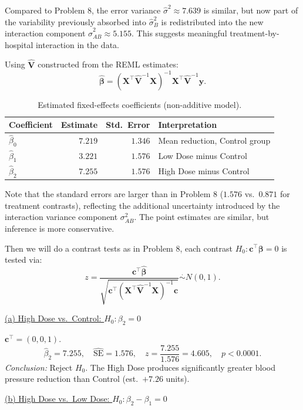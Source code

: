 \documentclass[letterpaper]{article}
\begin{document}
	Compared to Problem 8, the error variance $\hat{\sigma}^2 \approx 7.639$
	is similar, but now part of the variability previously absorbed into
	$\hat{\sigma}^2_B$ is redistributed into the new interaction component
	$\hat{\sigma}^2_{AB} \approx 5.155$. This suggests meaningful
	treatment-by-hospital interaction in the data.
	

	
	Using $\hat{\mathbf{V}}$ constructed from the REML estimates:
	\[
	\hat{\boldsymbol{\beta}}
	= (\mathbf{X}^\top\hat{\mathbf{V}}^{-1}\mathbf{X})^{-1}
	\mathbf{X}^\top\hat{\mathbf{V}}^{-1}\mathbf{y}.
	\]
	
	\begin{table}[H]
		\centering
		\begin{tabular}{lrrl}
			\toprule
			Coefficient & Estimate & Std.\ Error & Interpretation \\
			\midrule
			$\hat{\beta}_0$ & $7.219$ & $1.346$ & Mean reduction, Control group \\
			$\hat{\beta}_1$ & $3.221$ & $1.576$ & Low Dose minus Control \\
			$\hat{\beta}_2$ & $7.255$ & $1.576$ & High Dose minus Control \\
			\bottomrule
		\end{tabular}
		\caption{Estimated fixed-effects coefficients (non-additive model).}
	\end{table}
	
	Note that the standard errors are {larger} than in Problem 8
	($1.576$ vs.\ $0.871$ for treatment contrasts), reflecting the additional
	uncertainty introduced by the interaction variance component $\sigma^2_{AB}$.
	The point estimates are similar, but inference is more conservative.
	
	
	Then we will do a contrast tests as in Problem 8, each contrast $H_0:\mathbf{c}^\top\boldsymbol{\beta}=0$ is tested via:
	\[
	z = \frac{\mathbf{c}^\top\hat{\boldsymbol{\beta}}}
	{\sqrt{\mathbf{c}^\top(\mathbf{X}^\top\hat{\mathbf{V}}^{-1}\mathbf{X})^{-1}\mathbf{c}}}
	\overset{\cdot}{\sim} N(0,1).
	\]
	
	\underline{(a) High Dose vs.\ Control: $H_0:\beta_2=0$}
	
	$\mathbf{c}^\top=(0,0,1)$.
	\[
	\hat{\beta}_2 = 7.255,\quad
	\widehat{\text{SE}} = 1.576,\quad
	z = \frac{7.255}{1.576} = 4.605,\quad
	p < 0.0001.
	\]
	\textit{Conclusion:} Reject $H_0$. The High Dose produces significantly
	greater blood pressure reduction than Control (est.\ $+7.26$ units).
	
	\underline{(b) High Dose vs.\ Low Dose: $H_0:\beta_2-\beta_1=0$}
	
\end{document}
